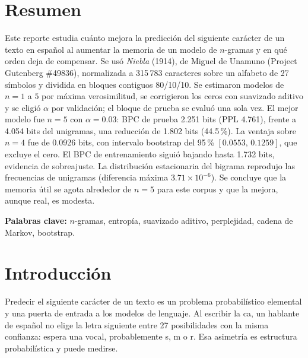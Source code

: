 \documentclass[11pt,letterpaper]{article}
\begin{document}
\section*{Resumen}

Este reporte estudia cuánto mejora la predicción del siguiente carácter de un texto en español al aumentar la memoria de un modelo de $n$-gramas y en qué orden deja de compensar. Se usó \emph{Niebla} (1914), de Miguel de Unamuno (Project Gutenberg \#49836), normalizada a 315\,783 caracteres sobre un alfabeto de 27 símbolos y dividida en bloques contiguos 80/10/10. Se estimaron modelos de $n=1$ a $5$ por máxima verosimilitud, se corrigieron los ceros con suavizado aditivo y se eligió $\alpha$ por validación; el bloque de prueba se evaluó una sola vez. El mejor modelo fue $n=5$ con $\alpha=0.03$: BPC de prueba 2.251 bits (PPL 4.761), frente a 4.054 bits del unigramas, una reducción de 1.802 bits (44.5\,\%). La ventaja sobre $n=4$ fue de 0.0926 bits, con intervalo bootstrap del 95\,\% $[0.0553,\,0.1259]$, que excluye el cero. El BPC de entrenamiento siguió bajando hasta 1.732 bits, evidencia de sobreajuste. La distribución estacionaria del bigrama reprodujo las frecuencias de unigramas (diferencia máxima $3.71\times10^{-6}$). Se concluye que la memoria útil se agota alrededor de $n=5$ para este corpus y que la mejora, aunque real, es modesta.

\vspace{0.5em}
\noindent\textbf{Palabras clave:} $n$-gramas, entropía, suavizado aditivo, perplejidad, cadena de Markov, bootstrap.

\section{Introducción}

Predecir el siguiente carácter de un texto es un problema probabilístico elemental y una puerta de entrada a los modelos de lenguaje. Al escribir \guillemotleft{}la ca\guillemotright{}, un hablante de español no elige la letra siguiente entre 27 posibilidades con la misma confianza: espera una vocal, probablemente \guillemotleft{}s\guillemotright{}, \guillemotleft{}m\guillemotright{} o \guillemotleft{}r\guillemotright{}. Esa asimetría es estructura probabilística y puede medirse.
\end{document}
